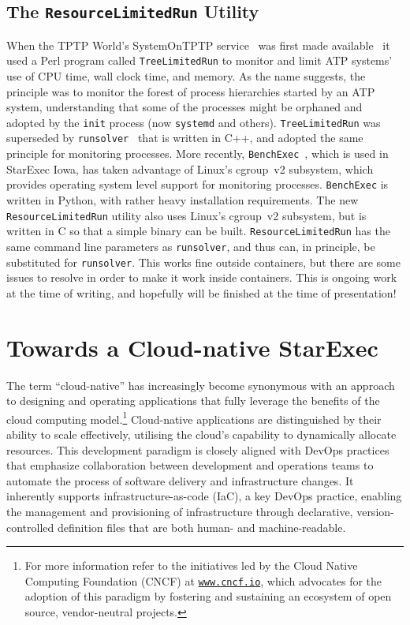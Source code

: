 \documentclass{easychair}
\begin{document}
\subsection{The {\tt ResourceLimitedRun} Utility}
\label{RLR}

When the TPTP World's SystemOnTPTP service~\cite{Sut00-CADE-17} was first made 
available~\cite{Sut07-CSR} it used a Perl program called {\tt TreeLimitedRun} to monitor and 
limit ATP systems' use of CPU time, wall clock time, and memory.
As the name suggests, the principle was to monitor the forest of process hierarchies started by
an ATP system, understanding that some of the processes might be orphaned and adopted by the
{\tt init} process (now {\tt systemd} and others).
{\tt TreeLimitedRun} was superseded by {\tt runsolver}~\cite{Rou11} that is written in C++, and
adopted the same principle for monitoring processes.
More recently, {\tt BenchExec}~\cite{BLW19}, which is used in StarExec Iowa, has taken advantage 
of Linux's cgroup~v2 subsystem, which provides operating system level support for monitoring 
processes.
{\tt BenchExec} is written in Python, with rather heavy installation requirements.
The new {\tt ResourceLimitedRun} utility also uses Linux's cgroup~v2 subsystem, but is written
in C so that a simple binary can be built.
{\tt ResourceLimitedRun} has the same command line parameters as {\tt runsolver}, and thus
can, in principle, be substituted for {\tt runsolver}.
This works fine outside containers, but there are some issues to resolve in order to make
it work inside containers.
This is ongoing work at the time of writing, and hopefully will be finished at the time of
presentation!

\section{Towards a Cloud-native StarExec}
\label{StarExecK}

The term ``cloud-native'' has increasingly become synonymous with an approach to designing and 
operating applications that fully leverage the benefits of the cloud computing model.\footnote{%
For more information refer to the initiatives led by the Cloud Native Computing Foundation (CNCF)
at \href{https://www.cncf.io/}{\tt www.cncf.io}, which advocates for the adoption of this paradigm
by fostering and sustaining an ecosystem of open source, vendor-neutral projects.}
Cloud-native applications are distinguished by their ability to scale effectively, utilising 
the cloud's capability to dynamically allocate resources. 
This development paradigm is closely aligned with DevOps practices that emphasize collaboration 
between development and operations teams to automate the process of software delivery and 
infrastructure changes. 
It inherently supports infrastructure-as-code (IaC), a key DevOps practice, enabling the management 
and provisioning of infrastructure through declarative, version-controlled definition files that 
are both human- and machine-readable.
\end{document}
